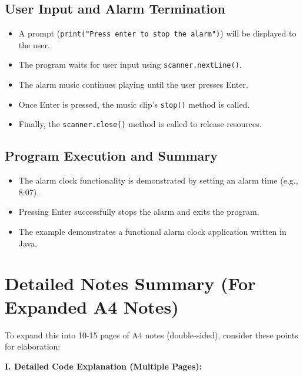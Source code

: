 \documentclass{article}
\begin{document}
\begin{itemize}
\subsection{User Input and Alarm Termination}

\begin{itemize}
    \item  A prompt (\texttt{print("Press enter to stop the alarm")}) will be displayed to the user.
    \item The program waits for user input using \texttt{scanner.nextLine()}.
    \item  The alarm music continues playing until the user presses Enter.
    \item Once Enter is pressed, the music clip's \texttt{stop()} method is called.
    \item Finally, the \texttt{scanner.close()} method is called to release resources.
\end{itemize}


\subsection{Program Execution and Summary}

\begin{itemize}
    \item The alarm clock functionality is demonstrated by setting an alarm time (e.g., 8:07).
    \item Pressing Enter successfully stops the alarm and exits the program.
    \item The example demonstrates a functional alarm clock application written in Java.
\end{itemize}


\section{Detailed Notes Summary (For Expanded A4 Notes)}

To expand this into 10-15 pages of A4 notes (double-sided), consider these points for elaboration:

\textbf{I.  Detailed Code Explanation (Multiple Pages): }


\end{itemize}
\end{document}
